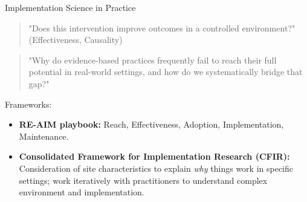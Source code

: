 \documentclass[aspectratio=169, 10pt]{beamer}
\begin{document}
\begin{frame}[fragile]{Implementation Science in Practice}
 \begin{center}
 \color{TXOrange}{  If clinical or policy research asks: }
  \begin{quote}"Does this intervention improve outcomes in a controlled environment?" (Effectiveness, Causality) \end{quote}
  \color{TXOrange}{  Implementation Science asks: }
 \begin{quote}"Why do evidence-based practices frequently fail to reach their full potential in real-world settings, and how do we systematically bridge that gap?"  \end{quote}
\end{center}
   Frameworks:
    \begin{itemize}
      \item \textbf{RE-AIM playbook:} Reach, Effectiveness, Adoption, Implementation,    Maintenance.
      	\item \textbf{Consolidated Framework for Implementation Research (CFIR):}    Consideration of site characteristics to explain \textit{why} things work in specific    settings; work iteratively with practitioners to understand complex environment and     implementation.
    \end{itemize}
   
\textsf{  \hfill   \color{TXOrange}{ \ldots  Why does this matter?}} 

\end{frame}
\end{document}
